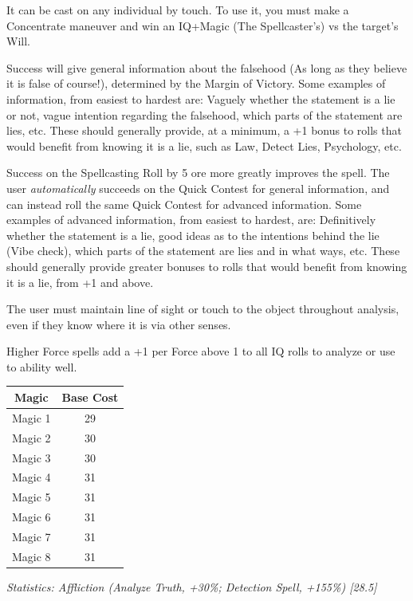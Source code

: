 \begin{multicols*}{3}
	It can be cast on any individual by touch. To use it, you must make a Concentrate maneuver and win an IQ+Magic (The Spellcaster's) vs the target's Will. 
	
	Success will give general information about the falsehood (As long as they believe it is false of course!), determined by the Margin of Victory. Some examples of information, from easiest to hardest are: Vaguely whether the statement is a lie or not, vague intention regarding the falsehood, which parts of the statement are lies, etc. These should generally provide, at a minimum, a +1 bonus to rolls that would benefit from knowing it is a lie, such as Law, Detect Lies, Psychology, etc.
	
	Success on the Spellcasting Roll by 5 ore more greatly improves the spell. The user \textit{automatically} succeeds on the Quick Contest for general information, and can instead roll the same Quick Contest for advanced information. Some examples of advanced information, from easiest to hardest, are: Definitively whether the statement is a lie, good ideas as to the intentions behind the lie (Vibe check), which parts of the statement are lies and in what ways, etc. These should generally provide greater bonuses to rolls that would benefit from knowing it is a lie, from +1 and above.
	
	The user must maintain line of sight or touch to the object throughout analysis, even if they know where it is via other senses.
	
	Higher Force spells add a +1 per Force above 1 to all IQ rolls to analyze or use to ability well.
	
	\begin{center}
		\begin{tabular}{|c|c|}
			\hline
			Magic & Base Cost \\
			\hline
			\hline
			Magic 1 & 29 \\
			Magic 2 & 30 \\
			Magic 3 & 30 \\
			Magic 4 & 31 \\
			Magic 5 & 31 \\
			Magic 6 & 31 \\
			Magic 7 & 31 \\
			Magic 8 & 31 \\
			\hline
		\end{tabular}
	\end{center}
	
	\textcolor{OliveGreen}{\textit{ Statistics: Affliction (Analyze Truth, +30\%; Detection Spell, +155\%) [28.5]}}
	

\end{multicols*}
